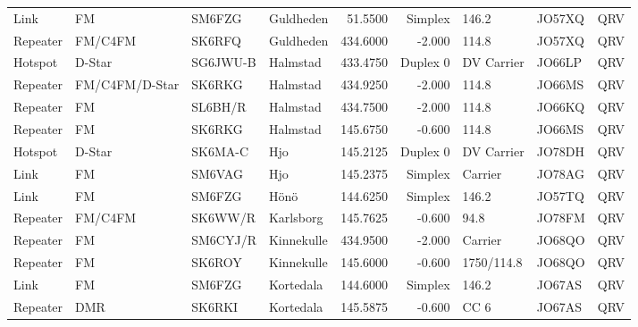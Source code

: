 {\begin{landscape}
\begin{longtable}{llllrrlll}
	Link              & FM              & SM6FZG   & Guldheden             &      51.5500 &    Simplex & 146.2             & JO57XQ      & QRV      \\
	Repeater          & FM/C4FM         & SK6RFQ   & Guldheden             &     434.6000 &     -2.000 & 114.8             & JO57XQ      & QRV      \\
	Hotspot           & D-Star          & SG6JWU-B & Halmstad              &     433.4750 &   Duplex 0 & DV Carrier        & JO66LP      & QRV      \\
	Repeater          & FM/C4FM/D-Star  & SK6RKG   & Halmstad              &     434.9250 &     -2.000 & 114.8             & JO66MS      & QRV      \\
	Repeater          & FM              & SL6BH/R  & Halmstad              &     434.7500 &     -2.000 & 114.8             & JO66KQ      & QRV      \\
	Repeater          & FM              & SK6RKG   & Halmstad              &     145.6750 &     -0.600 & 114.8             & JO66MS      & QRV      \\
	Hotspot           & D-Star          & SK6MA-C  & Hjo                   &     145.2125 &   Duplex 0 & DV Carrier        & JO78DH      & QRV      \\
	Link              & FM              & SM6VAG   & Hjo                   &     145.2375 &    Simplex & Carrier           & JO78AG      & QRV      \\
	Link              & FM              & SM6FZG   & Hönö                  &     144.6250 &    Simplex & 146.2             & JO57TQ      & QRV      \\
	Repeater          & FM/C4FM         & SK6WW/R  & Karlsborg             &     145.7625 &     -0.600 & 94.8              & JO78FM      & QRV      \\
	Repeater          & FM              & SM6CYJ/R & Kinnekulle            &     434.9500 &     -2.000 & Carrier           & JO68QO      & QRV      \\
	Repeater          & FM              & SK6ROY   & Kinnekulle            &     145.6000 &     -0.600 & 1750/114.8        & JO68QO      & QRV      \\
	Link              & FM              & SM6FZG   & Kortedala             &     144.6000 &    Simplex & 146.2             & JO67AS      & QRV      \\
	Repeater          & DMR             & SK6RKI   & Kortedala             &     145.5875 &     -0.600 & CC 6              & JO67AS      & QRV      \\

\end{longtable}
\end{landscape}}
